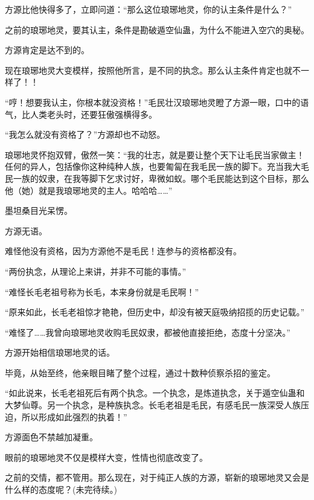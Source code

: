 \begin{this_body}
方源比他快得多了，立即问道：“那么这位琅琊地灵，你的认主条件是什么？”

之前的琅琊地灵，要其认主，条件是勘破遁空仙蛊，为什么不能进入空穴的奥秘。

方源肯定是达不到的。

现在琅琊地灵大变模样，按照他所言，是不同的执念。那么认主条件肯定也就不一样了！！

“哼！想要我认主，你根本就没资格！”毛民壮汉琅琊地灵瞪了方源一眼，口中的语气，比人类老头时，还要狂傲强横得多。

“我怎么就没有资格了？”方源却也不动怒。

琅琊地灵怀抱双臂，傲然一笑：“我的壮志，就是要让整个天下让毛民当家做主！任何的异人，包括像你这种纯种人族，也要匍匐在我毛民一族的脚下。充当我大毛民一族的奴隶，在我等脚下乞求讨好，卑微如蚁。哪个毛民能达到这个目标，那么他（她）就是我琅琊地灵的主人。哈哈哈……”

墨坦桑目光呆愣。

方源无语。

难怪他没有资格，因为方源他不是毛民！连参与的资格都没有。

“两份执念，从理论上来讲，并非不可能的事情。”

“难怪长毛老祖号称为长毛，本来身份就是毛民啊！”

“原来如此，长毛老祖惊才艳艳，但历史中，却没有被天庭吸纳招揽的历史记载。”

“难怪了……我曾向琅琊地灵收购毛民奴隶，都被他直接拒绝，态度十分坚决。”

方源开始相信琅琊地灵的话。

毕竟，从始至终，他亲眼目睹了整个过程，通过十数种侦察杀招的鉴定。

“如此说来，长毛老祖死后有两个执念。一个执念，是炼道执念，关于遁空仙蛊和大梦仙尊。另一个执念，是种族执念。长毛老祖是毛民，有感毛民一族深受人族压迫，所以形成如此强烈的执着！”

方源面色不禁越加凝重。

眼前的琅琊地灵不仅是模样大变，性情也彻底改变了。

之前的交情，都不管用。那么现在，对于纯正人族的方源，崭新的琅琊地灵又会是什么样的态度呢？(未完待续。)

\end{this_body}

